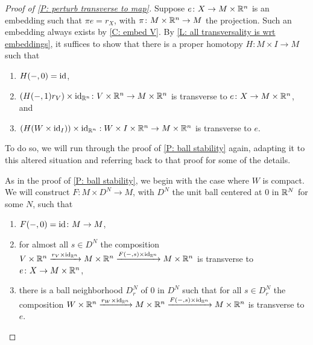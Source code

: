 \begin{proof}[Proof of \cref{P: perturb transverse to map}]
	Suppose $e \colon X \to M \times \mathbb{R}^n$ is an embedding such that $\pi e = r_X$, with $\pi \colon M \times \mathbb{R}^n \to M$ the projection.
	Such an embedding always exists by \cref{C: embed V}.
	By \cref{L: all transversality is wrt embeddings}, it suffices to show that there is a proper  homotopy $H \colon M \times I \to M$ such that
	\begin{enumerate}
		\item $H(-,0) = \mathrm{id}$,
		\item $(H(-,1)r_V) \times \mathrm{id}_{\mathbb{R}^n} \colon V \times \mathbb{R}^n \to M \times \mathbb{R}^n$ is transverse to $e \colon X \to M \times \mathbb{R}^n$, and
		\item $(H (W \times \mathrm{id}_I)) \times \mathrm{id}_{\mathbb{R}^n}: W \times I \times \mathbb{R}^n \to M \times \mathbb{R}^n$ is transverse to $e$.
	\end{enumerate}
	To do so, we will run through the proof of \cref{P: ball stability} again, adapting it to this altered situation and referring back to that proof for some of the details.

	\begin{comment}
		\red{Note to Dev and Anibal: I know this is a bit redundant and \cref{P: ball stability} is arguably a special case with $n = 0$ (though there are a few other differences), but the proof of \cref{P: ball stability} is already very complicated so I didn't want to just do this more general version earlier.}
	\end{comment}

	As in the proof of \cref{P: ball stability}, we begin with the case where $W$ is compact.
	We will construct $F \colon M \times D^N \to M$, with $D^N$ the unit ball centered at $0$ in $\mathbb{R}^N$ for some $N$, such that

	\begin{enumerate}
		\item $F(-,0) = \mathrm{id} \colon M \to M$,
		\item for almost all $s \in D^N$ the composition $V \times \mathbb{R}^n \xrightarrow{r_V \times \mathrm{id}_{\mathbb{R}^n}} M \times \mathbb{R}^n \xrightarrow{F(-,s) \times \mathrm{id}_{\mathbb{R}^n}} M \times \mathbb{R}^n$ is transverse to $e \colon X \to M \times \mathbb{R}^n$,

		\item there is a ball neighborhood $D_r^N$ of $0$ in $D^N$ such that for all $s \in D_r^N$ the composition $W \times \mathbb{R}^n \xrightarrow{r_W \times \mathrm{id}_{\mathbb{R}^n}} M \times \mathbb{R}^n \xrightarrow{F(-,s) \times \mathrm{id}_{\mathbb{R}^n}}M \times \mathbb{R}^n$ is transverse to $e$.
	\end{enumerate}


\end{proof}
